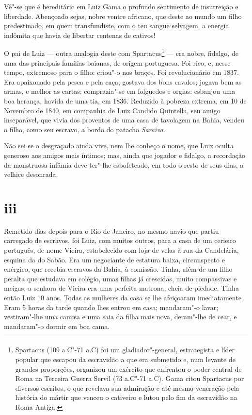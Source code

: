Vê"-se que é hereditário em Luiz Gama o profundo sentimento de
insurreição e liberdade. Abençoado sejas, nobre ventre africano, que
deste ao mundo um filho predestinado, em quem transfundiste, com o teu
sangue selvagem, a energia indômita que havia de libertar centenas de
cativos!

O pai de Luiz --- outra analogia deste com Spartacus\footnote{
  Spartacus (109 a.C"-71 a.C) foi um gladiador"-general, estrategista e
  líder popular que escapou da escravidão a que era submetido e, num
  levante de grandes proporções, organizou um exército que enfrentou o
  poder central de Roma na Terceira Guerra Servil (73 a.C"-71 a.C). Gama
  citou Spartacus por diversos escritos, o que revelava sua admiração e
  até mesmo veneração pela história do mártir que venceu o cativeiro e
  lutou pelo fim da escravidão na Roma Antiga.} --- era nobre, fidalgo,
de uma das principais famílias baianas, de origem portuguesa. Foi rico,
e, nesse tempo, extremoso para o filho: criou"-o nos braços. Foi
revolucionário em 1837. Era apaixonado pela pesca e pela caça; gostava
dos bons cavalos; jogava bem as armas, e melhor as cartas: comprazia"-se
em folguedos e orgias: esbanjou uma boa herança, havida de uma tia, em
1836. Reduzido à pobreza extrema, em 10 de Novembro de 1840, em
companhia de Luiz Candido Quintella, seu amigo inseparável, que vivia
dos proventos de uma casa de tavolagem na Bahia, vendeu o filho, como
seu escravo, a bordo do patacho \emph{Saraiva}.

Não sei se o desgraçado ainda vive, nem lhe conheço o nome, que Luiz
oculta generoso aos amigos mais íntimos; mas, ainda que jogador e
fidalgo, a recordação da monstruosa infâmia deve ter"-lhe esbofeteado, em
todo o resto de seus dias, a velhice desonrada.

\section*{iii}

Remetido dias depois para o Rio de Janeiro, no mesmo navio que partiu
carregado de escravos, foi Luiz, com muitos outros, para a casa de um
cerieiro português, de nome Vieira, estabelecido com loja de velas à rua
da Candelária, esquina da do Sabão. Era um negociante de estatura baixa,
circunspecto e enérgico, que recebia escravos da Bahia, à comissão.
Tinha, além de um filho peralta que estudava em colégio, umas filhas já
crescidas, muito compassivas e meigas; a senhora de Vieira era uma
perfeita matrona, cheia de piedade. Tinha então Luiz 10 anos. Todas as
mulheres da casa se lhe afeiçoaram imediatamente. Eram 5 horas da tarde
quando lhes entrou em casa; mandaram"-o lavar; vestiram"-lhe uma camisa e
uma saia da filha mais nova, deram"-lhe de cear, e mandaram"-o dormir em
boa cama.

